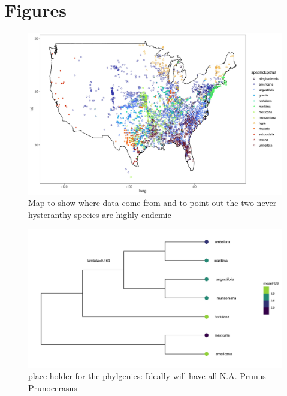\documentclass{article}\usepackage[]{graphicx}\usepackage[]{color}
\begin{document}
\section*{Figures}
    \begin{figure}[h!]
    \centering
 \includegraphics[width=\textwidth]{..//..//Plots/map.jpeg}
    \caption{Map to show where data come from and to point out the two never hysteranthy species are highly endemic}
    \label{fig:mappy}
\end{figure}

\begin{figure}[h!]
    \centering
 \includegraphics[width=\textwidth]{..//..//Plots/phylosig1.jpeg}
    \caption{place holder for the phylgenies: Ideally will have all N.A. Prunus  Prunocerasus }
    \label{fig:phylo}
\end{figure}
\end{document}
